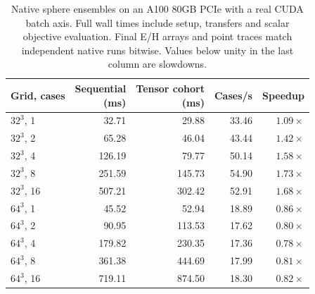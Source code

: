 \begin{table}[tbp]
\centering
\small
\renewcommand{\arraystretch}{1.15}
\caption{Native sphere ensembles on an A100 80GB PCIe with a real CUDA batch axis. Full wall times include setup, transfers and scalar objective evaluation. Final E/H arrays and point traces match independent native runs bitwise. Values below unity in the last column are slowdowns.}
\label{tab:tensor-batch}
\begin{tabular}{@{}lrrrr@{}}
\toprule
Grid, cases & \shortstack{Sequential\\(ms)} & \shortstack{Tensor cohort\\(ms)} & Cases/s & Speedup \\
\midrule
$32^3$, 1 & 32.71 & 29.88 & 33.46 & $1.09\times$ \\
$32^3$, 2 & 65.28 & 46.04 & 43.44 & $1.42\times$ \\
$32^3$, 4 & 126.19 & 79.77 & 50.14 & $1.58\times$ \\
$32^3$, 8 & 251.59 & 145.73 & 54.90 & $1.73\times$ \\
$32^3$, 16 & 507.21 & 302.42 & 52.91 & $1.68\times$ \\
$64^3$, 1 & 45.52 & 52.94 & 18.89 & $0.86\times$ \\
$64^3$, 2 & 90.95 & 113.53 & 17.62 & $0.80\times$ \\
$64^3$, 4 & 179.82 & 230.35 & 17.36 & $0.78\times$ \\
$64^3$, 8 & 361.38 & 444.69 & 17.99 & $0.81\times$ \\
$64^3$, 16 & 719.11 & 874.50 & 18.30 & $0.82\times$ \\
\bottomrule
\end{tabular}
\end{table}
